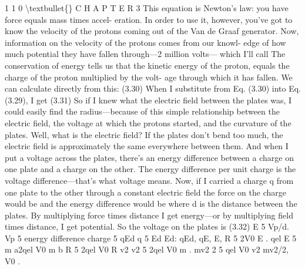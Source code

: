 \documentclass[10pt,oneside]{article}
\begin{document}
1 1 0 \textbackslash{}textbullet\{\} C H A P T E R  3 This equation is Newton’s law: you have force equals mass times accel- eration. In order to use it, however, you’ve got to know the velocity of the protons coming out of the Van de Graaf generator. Now, information on the velocity of the protons comes from our knowl- edge of how much potential they have fallen through---2 million volts--- which I’ll call The conservation of energy tells us that the kinetic energy of the proton, equals the charge of the proton multiplied by the volt- age through which it has fallen. We can calculate directly from this: (3.30) When I substitute from Eq. (3.30) into Eq. (3.29), I get (3.31) So if I knew what the electric field between the plates was, I could easily find the radius---because of this simple relationship between the electric field, the voltage at which the protons started, and the curvature of the plates. Well, what is the electric field? If the plates don’t bend too much, the electric field is approximately the same everywhere between them. And when I put a voltage across the plates, there’s an energy difference between a charge on one plate and a charge on the other. The energy difference per unit charge is the voltage difference---that’s what voltage means. Now, if I carried a charge q from one plate to the other through a constant electric field the force on the charge would be and the energy difference would be where d is the distance between the plates. By multiplying force times distance I get energy---or by multiplying field times distance, I get potential. So the voltage on the plates is (3.32) E 5 Vp/d. Vp 5 energy difference charge 5 qEd q 5 Ed Ed: qEd, qE, E, R 5 2V0 E . qel E 5 m a2qel V0 m b R 5 2qel V0 R v2 v2 5 2qel V0 m . mv2 2 5 qel V0 v2 mv2/2, V0 .\par
\end{document}

